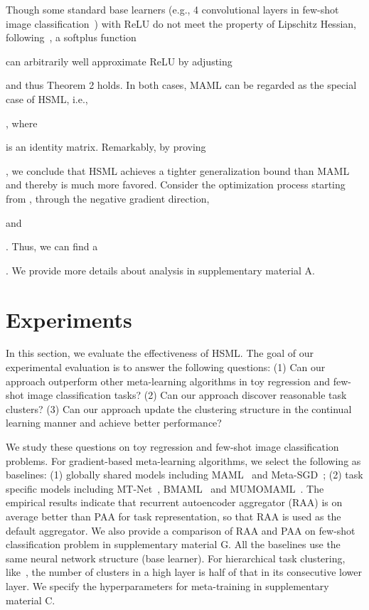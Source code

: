 \documentclass{article}
\begin{document}
Though some standard base learners (e.g., 4 convolutional layers in few-shot image classification~\cite{finn2017model}) with ReLU do not meet the property of Lipschitz Hessian, following~\cite{nguyen2018optimization}, a softplus function  \begin{small}\end{small} can arbitrarily well approximate ReLU by adjusting \begin{small}\end{small} and thus Theorem 2 holds. In both cases, 
MAML can be regarded as 
the special case of HSML, i.e., \begin{small}\end{small}, where \begin{small}\end{small} is an identity matrix. 
Remarkably, by proving \begin{small}\end{small},
we conclude that HSML achieves a tighter generalization bound than MAML and thereby is much more favored.
Consider the optimization process starting from , through the negative gradient direction, \begin{small}\end{small} and \begin{small}\end{small}. Thus, we can find a \begin{small}\end{small}. We provide more details about analysis in supplementary material A. \section{Experiments}
\label{sec:exp}
In this section, we evaluate the effectiveness of HSML. The goal of our experimental evaluation is to answer the following questions: (1) Can our approach outperform other meta-learning algorithms in toy regression and few-shot image classification tasks? (2) Can our approach discover reasonable task clusters? (3) Can our approach update the clustering structure in the continual learning manner and achieve better performance?

We study these questions on toy regression and few-shot image classification problems. For gradient-based meta-learning algorithms, we select the following as baselines: (1) globally shared models including MAML~\cite{finn2017model} and Meta-SGD~\cite{li2017meta}; (2) task specific models including MT-Net~\cite{lee2018gradient}, BMAML~\cite{yoon2018bayesian} and MUMOMAML~\cite{vuorio2018toward}. The empirical results indicate that recurrent autoencoder aggregator (RAA) is on average better than PAA for task representation, so that RAA is used as the default aggregator. We also provide a comparison of RAA and PAA on few-shot classification problem in supplementary material G. All the baselines use the same neural network structure (base learner). For hierarchical task clustering, like~\cite{ying2018hierarchical}, the number of clusters in a high layer is half of that in its consecutive lower layer. We specify the hyperparameters for meta-training in supplementary material C. 
\end{document}
